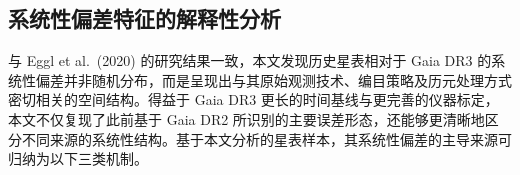 \documentclass{aastex701}
\begin{document}
\subsection{系统性偏差特征的解释性分析} \label{subsec:interpretation}

与 Eggl et al.\ (2020) 的研究结果一致，本文发现历史星表相对于 Gaia DR3 的系统性偏差并非随机分布，而是呈现出与其原始观测技术、编目策略及历元处理方式密切相关的空间结构。得益于 Gaia DR3 更长的时间基线与更完善的仪器标定，本文不仅复现了此前基于 Gaia DR2 所识别的主要误差形态，还能够更清晰地区分不同来源的系统性结构。基于本文分析的星表样本，其系统性偏差的主导来源可归纳为以下三类机制。
\end{document}
